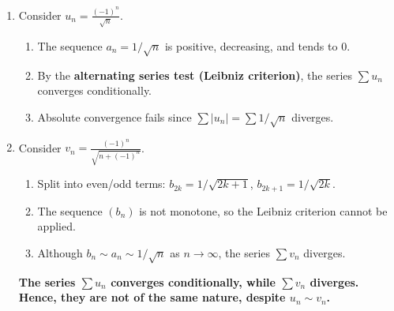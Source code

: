 \documentclass[12pt]{article}
\begin{document}
\begin{correctionbox}
\begin{enumerate}
    \item Consider $u_n = \frac{(-1)^n}{\sqrt{n}}$.
    \begin{enumerate}
        \item The sequence $a_n = 1/\sqrt{n}$ is positive, decreasing, and tends to $0$.
        \item By the \textbf{alternating series test (Leibniz criterion)}, the series $\sum u_n$ converges conditionally.
        \item Absolute convergence fails since $\sum |u_n| = \sum 1/\sqrt{n}$ diverges.
    \end{enumerate}

    \item Consider $v_n = \frac{(-1)^n}{\sqrt{n + (-1)^n}}$.
    \begin{enumerate}
        \item Split into even/odd terms: $b_{2k} = 1/\sqrt{2k+1}$, $b_{2k+1} = 1/\sqrt{2k}$.
        \item The sequence $(b_n)$ is not monotone, so the Leibniz criterion cannot be applied.
        \item Although $b_n \sim a_n \sim 1/\sqrt{n}$ as $n \to \infty$, the series $\sum v_n$ diverges.
    \end{enumerate}

    \textbf{The series $\sum u_n$ converges conditionally, while $\sum v_n$ diverges. Hence, they are not of the same nature, despite $u_n \sim v_n$.}
\end{enumerate}
\end{correctionbox}
\end{document}
